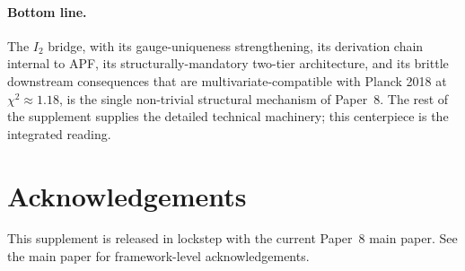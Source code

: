 \documentclass[11pt]{article}
\theoremstyle{plain}
\theoremstyle{definition}
\theoremstyle{remark}
\begin{document}
\paragraph{Bottom line.}  The $I_2$ bridge, with its gauge-uniqueness strengthening, its derivation chain internal to APF, its structurally-mandatory two-tier architecture, and its brittle downstream consequences that are multivariate-compatible with Planck 2018 at $\chi^2 \approx 1.18$, is the single non-trivial structural mechanism of Paper~8.  The rest of the supplement supplies the detailed technical machinery; this centerpiece is the integrated reading.

\section*{Acknowledgements}

\noindent This supplement is released in lockstep with the current Paper~8 main paper.  See the main paper for framework-level acknowledgements.
\end{document}
